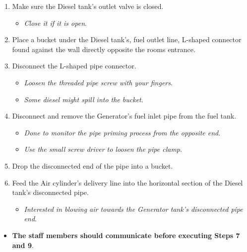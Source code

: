 \documentclass[
  letterpaper,
  DIV=11,
  numbers=noendperiod]{scrreprt}
\providecommand{\tightlist}{%
  \setlength{\itemsep}{0pt}\setlength{\parskip}{0pt}}\usepackage{longtable,booktabs,array}
\begin{document}
\begin{enumerate}
\def\labelenumi{\arabic{enumi}.}
\tightlist
\item
  Make sure the Diesel tank's outlet valve is closed.

  \begin{itemize}
  \tightlist
  \item
    \emph{Close it if it is open}.
  \end{itemize}
\item
  Place a bucket under the Diesel tank's, fuel outlet line, L-shaped
  connector found against the wall directly opposite the rooms entrance.
\item
  Disconnect the L-shaped pipe connector.

  \begin{itemize}
  \tightlist
  \item
    \emph{Loosen the threaded pipe screw with your fingers}.
  \item
    \emph{Some diesel might spill into the bucket}.
  \end{itemize}
\item
  Disconnect and remove the Generator's fuel inlet pipe from the fuel
  tank.

  \begin{itemize}
  \tightlist
  \item
    \emph{Done to monitor the pipe priming process from the opposite
    end}.
  \item
    \emph{Use the small screw driver to loosen the pipe clamp}.
  \end{itemize}
\item
  Drop the disconnected end of the pipe into a bucket.
\item
  Feed the Air cylinder's delivery line into the horizontal section of
  the Diesel tank's disconnected pipe.

  \begin{itemize}
  \tightlist
  \item
    \emph{Interested in blowing air towards the Generator tank's
    disconnected pipe end}.
  \end{itemize}
\end{enumerate}

\begin{itemize}
\tightlist
\item
  \textbf{The staff members should communicate before executing Steps 7
  and 9}.
\end{itemize}
\end{document}
